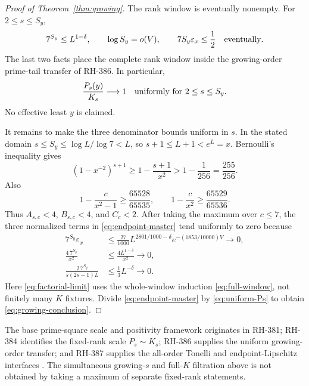 \documentclass[11pt]{article}
\theoremstyle{definition}
\theoremstyle{remark}
\newcommand{\eps}{\varepsilon}
\begin{document}
\begin{proof}[Proof of Theorem~\ref{thm:growing}]
The rank window is eventually nonempty.  For $2\le s\le S_y$,
\begin{equation}
 7^{S_y}\le L^{1-\delta},\qquad
 \log S_y=o(V),\qquad 7S_y\eps_x\le\frac12
 \quad\hbox{eventually}.
 \label{eq:growing-bridges}
\end{equation}
The last two facts place the complete rank window inside the growing-order
prime-tail transfer of RH-386.  In particular,
\begin{equation}
 \frac{P_s(y)}{K_s}\longrightarrow1
 \quad\hbox{uniformly for }2\le s\le S_y.
 \label{eq:uniform-Ps}
\end{equation}
No effective least $y$ is claimed.

It remains to make the three denominator bounds uniform in $s$.  In the
stated domain
$s\le S_y\le\log L/\log7<L$, so $s+1\le L+1<e^L=x$.
Bernoulli's inequality gives
\begin{equation}
 (1-x^{-2})^{s+1}\ge1-\frac{s+1}{x^2}
 >1-\frac1{256}=\frac{255}{256}.
 \label{eq:Bernoulli-floor}
\end{equation}
Also
\[
 1-\frac{c}{x^2-1}\ge\frac{65528}{65535},\qquad
 1-\frac{c}{x^2}\ge\frac{65529}{65536}.
\]
Thus $A_{s,c}<4$, $B_{s,c}<4$, and $C_c<2$.  After taking the
maximum over $c\le7$, the three normalized terms in
\eqref{eq:endpoint-master} tend uniformly to zero because
\begin{align}
 7^{S_y}\eps_x
 &\le\frac{27}{1000}L^{2801/1000-\delta}
 e^{-(1853/10000)V}\longrightarrow0,
 \label{eq:source-limit}\\
 \frac{4\,7^{S_y}}{x^2}
 &\le\frac{4L^{1-\delta}}{x^2}\longrightarrow0,
 \label{eq:power-limit}\\
 \frac{2\,7^{S_y}}{s(2s-1)L}
 &\le\frac13L^{-\delta}\longrightarrow0.
 \label{eq:factorial-limit}
\end{align}
Here \eqref{eq:factorial-limit} uses the whole-window induction
\eqref{eq:full-window}, not finitely many $K$ fixtures.  Divide
\eqref{eq:endpoint-master} by \eqref{eq:uniform-Ps} to obtain
\eqref{eq:growing-conclusion}.
\end{proof}

The base prime-square scale and positivity framework originates in
RH-381; RH-384 identifies the fixed-rank scale $P_s\sim K_s$; RH-386
supplies the uniform growing-order transfer; and RH-387 supplies the
all-order Tonelli and endpoint-Lipschitz interfaces
\cite{RH381,RH384,RH386,RH387}.  The simultaneous growing-$s$ and
full-$K$ filtration above is not obtained by taking a maximum of
separate fixed-rank statements.
\end{document}
